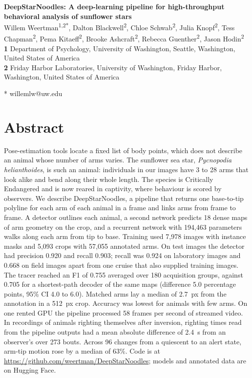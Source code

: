 \begin{flushleft}
{\Large
\textbf{DeepStarNoodles: A deep-learning pipeline for high-throughput behavioral analysis of sunflower stars}
}
\newline
\\
Willem Weertman\textsuperscript{1,2*},
Dalton Blackwell\textsuperscript{2},
Chloe Schwab\textsuperscript{2},
Julia Knopf\textsuperscript{2},
Tess Chapman\textsuperscript{2},
Pema Kitaeff\textsuperscript{2},
Brooke Ashcraft\textsuperscript{2},
Rebecca Guenther\textsuperscript{2},
Jason Hodin\textsuperscript{2}
\\
\bigskip
\textbf{1} Department of Psychology, University of Washington, Seattle, Washington, United States of America
\\
\textbf{2} Friday Harbor Laboratories, University of Washington, Friday Harbor, Washington, United States of America
\\
\bigskip

* willemlw@uw.edu

\end{flushleft}

\section*{Abstract}

Pose-estimation tools locate a fixed list of body points, which does not describe an animal whose number of arms varies.
The sunflower sea star, \textit{Pycnopodia helianthoides}, is such an animal: individuals in our images have 3 to 28 arms that look alike and bend along their whole length.
The species is Critically Endangered and is now reared in captivity, where behaviour is scored by observers.
We describe DeepStarNoodles, a pipeline that returns one base-to-tip polyline for each arm of each animal in a frame and links arms from frame to frame.
A detector outlines each animal, a second network predicts 18 dense maps of arm geometry on the crop, and a recurrent network with 194,463 parameters walks along each arm from tip to base.
Training used 7,978 images with instance masks and 5,093 crops with 57,055 annotated arms.
On test images the detector had precision 0.920 and recall 0.903; recall was 0.924 on laboratory images and 0.668 on field images apart from one cruise that also supplied training images.
The tracer reached an F1 of 0.755 averaged over 180 acquisition groups, against 0.705 for a shortest-path decoder of the same maps (difference 5.0 percentage points, 95\% CI 4.0 to 6.0).
Matched arms lay a median of 2.7~px from the annotation in a 512~px crop.
Accuracy was lowest for animals with few arms.
On one rented GPU the pipeline processed 58 frames per second of streamed video.
In recordings of animals righting themselves after inversion, righting times read from the pipeline outputs had a mean absolute difference of 2.4~s from an observer's over 273 bouts.
Across 96 changes from a quiescent to an alert state, arm-tip motion rose by a median of 63\%.
Code is at \url{https://github.com/weertman/DeepStarNoodles}; models and annotated data are on Hugging Face.

